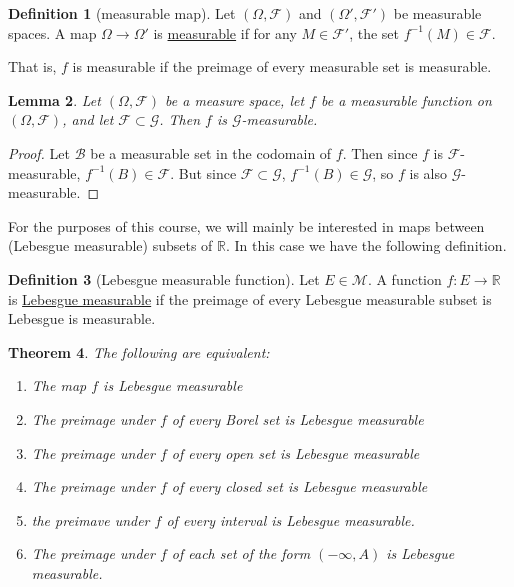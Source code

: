 \documentclass[a4paper,12pt]{scrreprt}
\newcommand{\R}{\mathbb{R}}
\newcommand{\defn}[1]{\ul{#1}}
\theoremstyle{definition}
\newtheorem{definition}{Definition}
\theoremstyle{plain}
\newtheorem{theorem}[definition]{Theorem}
\newtheorem{lemma}[definition]{Lemma}
\theoremstyle{remark}
\begin{document}
\begin{definition}[measurable map]
  \label{def:measurablefunction}
  Let $(\Omega, \mathcal{F})$ and $(\Omega', \mathcal{F}')$ be measurable spaces. A map $\Omega \to \Omega'$ is \defn{measurable} if for any $M \in \mathcal{F}'$, the set $f^{-1}(M) \in \mathcal{F}$.

  That is, $f$ is measurable if the preimage of every measurable set is measurable.
\end{definition}

\begin{lemma}
  \label{lemma:functionalsomeasurablewithrespecttobiggersigmaalgebra}
  Let $(\Omega, \mathcal{F})$ be a measure space, let $f$ be a measurable function on $(\Omega, \mathcal{F})$, and let $\mathcal{F} \subset \mathcal{G}$. Then $f$ is $\mathcal{G}$-measurable.
\end{lemma}
\begin{proof}
  Let $\mathcal{B}$ be a measurable set in the codomain of $f$. Then since $f$ is $\mathcal{F}$-measurable, $f^{-1}(B) \in \mathcal{F}$. But since $\mathcal{F} \subset \mathcal{G}$, $f^{-1}(B) \in \mathcal{G}$, so $f$ is also $\mathcal{G}$-measurable.
\end{proof}

For the purposes of this course, we will mainly be interested in maps between (Lebesgue measurable) subsets of $\R$. In this case we have the following definition.
\begin{definition}[Lebesgue measurable function]
  \label{def:lebesguemeasurablefunction}
  Let $E \in \mathcal{M}$. A function $f\colon E \to \R$ is \defn{Lebesgue measurable} if the preimage of every Lebesgue measurable subset is Lebesgue is measurable.
\end{definition}

\begin{theorem}
  The following are equivalent:
  \begin{enumerate}
    \item The map $f$ is Lebesgue measurable

    \item The preimage under $f$ of every Borel set is Lebesgue measurable

    \item The preimage under $f$ of every open set is Lebesgue measurable

    \item The preimage under $f$ of every closed set is Lebesgue measurable

    \item the preimave under $f$ of every interval is Lebesgue measurable.

    \item The preimage under $f$ of each set of the form $(-\infty, A)$ is Lebesgue measurable.
  \end{enumerate}
\end{theorem}
\end{document}
